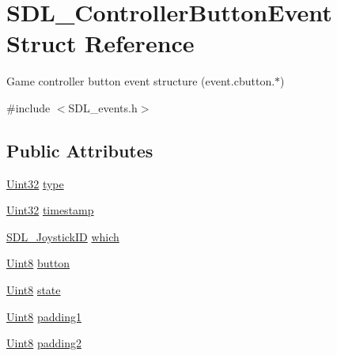 \hypertarget{struct_s_d_l___controller_button_event}{}\section{S\+D\+L\+\_\+\+Controller\+Button\+Event Struct Reference}
\label{struct_s_d_l___controller_button_event}


Game controller button event structure (event.\+cbutton.$\ast$)  




{\ttfamily \#include $<$S\+D\+L\+\_\+events.\+h$>$}

\subsection*{Public Attributes}
\begin{DoxyCompactItemize}
\item 
\mbox{\hyperlink{_s_d_l__stdinc_8h_add440eff171ea5f55cb00c4a9ab8672d}{Uint32}} \mbox{\hyperlink{struct_s_d_l___controller_button_event_a09869d792031e47a88673d85915c209f}{type}}
\item 
\mbox{\hyperlink{_s_d_l__stdinc_8h_add440eff171ea5f55cb00c4a9ab8672d}{Uint32}} \mbox{\hyperlink{struct_s_d_l___controller_button_event_a73003712734c4d2f966db3d7c2ce826b}{timestamp}}
\item 
\mbox{\hyperlink{_s_d_l__joystick_8h_a3c3d32500cb08f76ee8077983912c0bd}{S\+D\+L\+\_\+\+Joystick\+ID}} \mbox{\hyperlink{struct_s_d_l___controller_button_event_a98777e88b5d5cae83eef16ffd4bcacc1}{which}}
\item 
\mbox{\hyperlink{_s_d_l__stdinc_8h_a2944638813a090aa23e62f4da842c3e2}{Uint8}} \mbox{\hyperlink{struct_s_d_l___controller_button_event_a039da6cd31c3c62e62a3ae17cc64d0db}{button}}
\item 
\mbox{\hyperlink{_s_d_l__stdinc_8h_a2944638813a090aa23e62f4da842c3e2}{Uint8}} \mbox{\hyperlink{struct_s_d_l___controller_button_event_a00c46683f86674c2a4f74404ee3e857c}{state}}
\item 
\mbox{\hyperlink{_s_d_l__stdinc_8h_a2944638813a090aa23e62f4da842c3e2}{Uint8}} \mbox{\hyperlink{struct_s_d_l___controller_button_event_a34d3e43fc1994288b9b083c874bc0899}{padding1}}
\item 
\mbox{\hyperlink{_s_d_l__stdinc_8h_a2944638813a090aa23e62f4da842c3e2}{Uint8}} \mbox{\hyperlink{struct_s_d_l___controller_button_event_a8caf56a3921227913cfb652d5de1eec4}{padding2}}
\end{DoxyCompactItemize}


